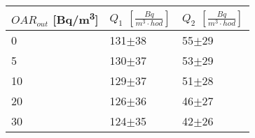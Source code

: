 \begin{tabular}{lll}
\toprule
$OAR_{out}$ [\si{Bq/m^3}] & $Q_1$ $\left[\si{\frac{Bq}{m^3\cdot hod}}\right]$ & $Q_2$ $\left[\si{\frac{Bq}{m^3\cdot hod}}\right]$ \\
\midrule
0  &                                          131$\pm$38 &                                           55$\pm$29 \\
5  &                                          130$\pm$37 &                                           53$\pm$29 \\
10 &                                          129$\pm$37 &                                           51$\pm$28 \\
20 &                                          126$\pm$36 &                                           46$\pm$27 \\
30 &                                          124$\pm$35 &                                           42$\pm$26 \\
\bottomrule
\end{tabular}
